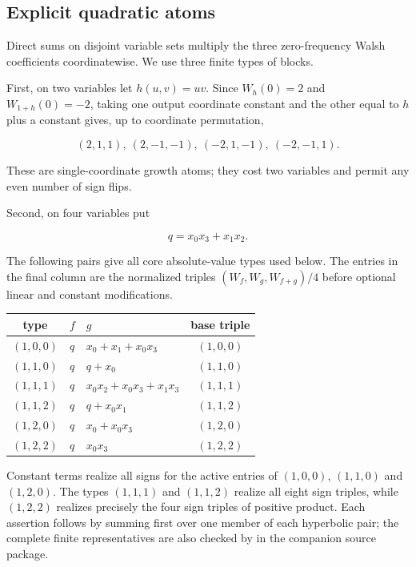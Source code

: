 \documentclass[11pt]{article}
\theoremstyle{remark}
\begin{document}
\subsection{Explicit quadratic atoms}

Direct sums on disjoint variable sets multiply the three zero-frequency Walsh coefficients coordinatewise. We use three finite types of blocks.

First, on two variables let $h(u,v)=uv$. Since $W_h(0)=2$ and $W_{1+h}(0)=-2$, taking one output coordinate constant and the other equal to $h$ plus a constant gives, up to coordinate permutation,

\[
(2,1,1),\ (2,-1,-1),\ (-2,1,-1),\ (-2,-1,1).
\tag{26}
\]

These are single-coordinate growth atoms; they cost two variables and permit any even number of sign flips.

Second, on four variables put

\[
q=x_0x_3+x_1x_2.
\]

The following pairs give all core absolute-value types used below. The entries in the final column are the normalized triples $(W_f,W_g,W_{f+g})/4$ before optional linear and constant modifications.

\begin{center}
\small
\begin{tabular}{@{}c p{} p{} c@{}}
\toprule
type & $f$ & $g$ & base triple \\
\midrule
$(1,0,0)$ & $q$ & $x_0+x_1+x_0x_3$ & $(1,0,0)$ \\
$(1,1,0)$ & $q$ & $q+x_0$ & $(1,1,0)$ \\
$(1,1,1)$ & $q$ & $x_0x_2+x_0x_3+x_1x_3$ & $(1,1,1)$ \\
$(1,1,2)$ & $q$ & $q+x_0x_1$ & $(1,1,2)$ \\
$(1,2,0)$ & $q$ & $x_0+x_0x_3$ & $(1,2,0)$ \\
$(1,2,2)$ & $q$ & $x_0x_3$ & $(1,2,2)$ \\
\bottomrule
\end{tabular}
\end{center}

Constant terms realize all signs for the active entries of $(1,0,0)$, $(1,1,0)$ and $(1,2,0)$. The types $(1,1,1)$ and $(1,1,2)$ realize all eight sign triples, while $(1,2,2)$ realizes precisely the four sign triples of positive product. Each assertion follows by summing first over one member of each hyperbolic pair; the complete finite representatives are also checked by \texttt{} in the companion source package.
\end{document}

